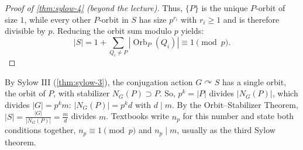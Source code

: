 \begin{content}
\begin{proof}[Proof of \cref{thm:sylow-4} (beyond the lecture)]
Thus, $\{P\}$ is the unique $P$-orbit of size $1$, while every other $P$-orbit in $S$ has size $p^{r_i}$ with $r_i \ge 1$ and is therefore divisible by $p$. Reducing the orbit sum modulo $p$ yields:
\[
|S| = 1 + \sum_{Q_i \neq P} |\operatorname{Orb}_P(Q_i)| \equiv 1 \pmod p.
\]
\end{proof}
\end{content}

\begin{aiNote}
By Sylow III (\cref{thm:sylow-3}), the conjugation action $G \curvearrowright S$ has a single orbit, the orbit of $P$, with stabilizer $N_G(P) \supset P$. So, $p^k = |P|$ divides $|N_G(P)|$, which divides $|G| = p^k m$: $|N_G(P)| = p^k d$ with $d \mid m$. By the Orbit--Stabilizer Theorem, $|S| = \frac{|G|}{|N_G(P)|} = \frac{m}{d}$ divides $m$. Textbooks write $n_p$ for this number and state both conditions together, $n_p \equiv 1 \pmod p$ and $n_p \mid m$, usually as the third Sylow theorem.
\end{aiNote}

